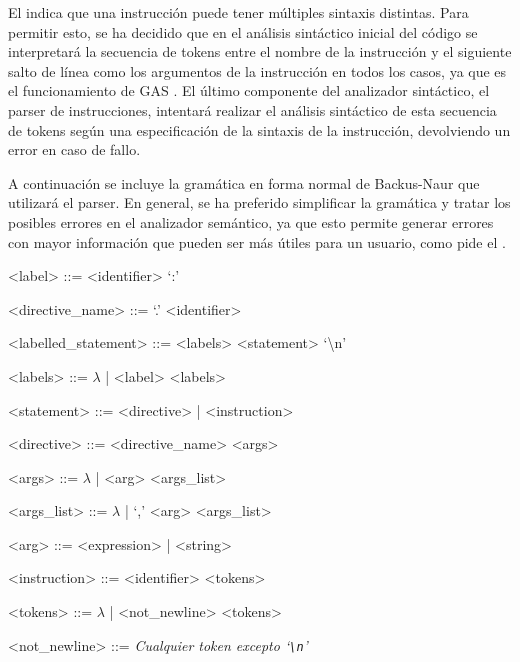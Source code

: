 El  indica que una instrucción puede tener
múltiples sintaxis distintas. Para permitir esto, se ha decidido que en el
análisis sintáctico inicial del código se interpretará la secuencia de
\glspl{token} entre el nombre de la instrucción y el siguiente salto de línea
como los argumentos de la instrucción en todos los casos, ya que es el
funcionamiento de GAS \parencite{as-manual}. El último componente del
analizador sintáctico, el \gls{parser} de instrucciones, intentará realizar el
análisis sintáctico de esta secuencia de \glspl{token} según una especificación
de la sintaxis de la instrucción, devolviendo un error en caso de fallo.

A continuación se incluye la gramática en forma normal de Backus-Naur
\parencite{BNF} que utilizará el \gls{parser}. En general, se ha preferido
simplificar la gramática y tratar los posibles errores en el analizador
semántico, ya que esto permite generar errores con mayor información que pueden
ser más útiles para un usuario, como pide el . %

\newcommand{\EOL}{\textbackslash{}n}
\newcommand{\verbEOL}{`\texttt{\textbackslash{}n}'}

\begin{tcolorbox}[enhanced jigsaw,breakable,top=4mm]
    \begin{grammar}
       <label> ::= <identifier> `:'

       <directive\_name> ::= `.' <identifier>

       <labelled\_statement> ::= <labels> <statement> `\EOL'

       <labels> ::= $\lambda$ | <label> <labels>

       <statement> ::= <directive> | <instruction>

       <directive> ::= <directive\_name> <args>

       <args> ::= $\lambda$ | <arg> <args\_list>

       <args\_list> ::= $\lambda$ | `,' <arg> <args\_list>

       <arg> ::= <expression> | <string>

       <instruction> ::= <identifier> <tokens>

       <tokens> ::= $\lambda$ | <not\_newline> <tokens>

       <not\_newline> ::= \textit{Cualquier token excepto \verbEOL}
    \end{grammar}
\end{tcolorbox}

